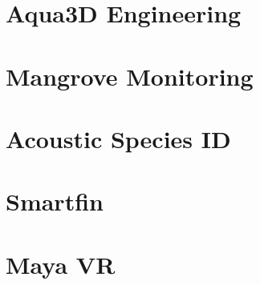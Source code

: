 \section{Aqua3D Engineering}

\section{Mangrove Monitoring}

\section{Acoustic Species ID}

\section{Smartfin}

\section{Maya VR}


